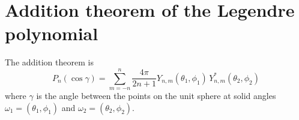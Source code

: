 \documentclass[11pt]{article}
\begin{document}
\section{Addition theorem of the Legendre polynomial}



The addition theorem is
\begin{equation}
  P_n(\cos\gamma)
= \sum_{m = -n}^n \frac{ 4 \pi } { 2 n + 1 }
  Y_{n, m}(\theta_1, \phi_1) \, Y_{n, m}^*(\theta_2, \phi_2)
\label{eq:addition}
\end{equation}
where
$\gamma$ is the angle between the points on the unit sphere
at solid angles
$\omega_1 = (\theta_1, \phi_1)$
and
$\omega_2 = (\theta_2, \phi_2)$.
\end{document}
